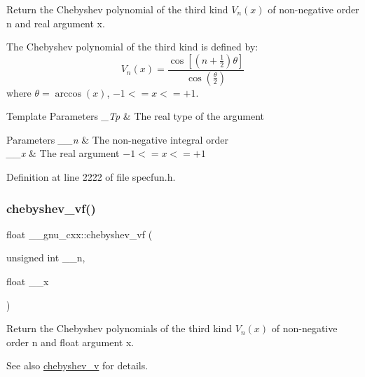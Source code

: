Return the Chebyshev polynomial of the third kind $ V_n(x) $ of non-\/negative order {\ttfamily n} and real argument {\ttfamily x}.

The Chebyshev polynomial of the third kind is defined by\+: \[ V_n(x) = \frac{\cos \left[ \left(n+\frac{1}{2}\right)\theta \right]} {\cos \left(\frac{\theta}{2}\right)} \] where $ \theta = \arccos(x) $, $ -1 <= x <= +1 $.


\begin{DoxyTemplParams}{Template Parameters}
{\em \+\_\+\+Tp} & The real type of the argument \\
\hline
\end{DoxyTemplParams}

\begin{DoxyParams}{Parameters}
{\em \+\_\+\+\_\+n} & The non-\/negative integral order \\
\hline
{\em \+\_\+\+\_\+x} & The real argument $ -1 <= x <= +1 $ \\
\hline
\end{DoxyParams}


Definition at line 2222 of file specfun.\+h.

\mbox{\label{group__mathsf__gnu_gaa9635a0da4bdeaa8060ae5cf03c3a12d}} 
\subsubsection{\texorpdfstring{chebyshev\+\_\+vf()}{chebyshev\_vf()}}
{\footnotesize\ttfamily float \+\_\+\+\_\+gnu\+\_\+cxx\+::chebyshev\+\_\+vf (\begin{DoxyParamCaption}\item[{unsigned int}]{\+\_\+\+\_\+n,  }\item[{float}]{\+\_\+\+\_\+x }\end{DoxyParamCaption})\hspace{0.3cm}{\ttfamily [inline]}}

Return the Chebyshev polynomials of the third kind $ V_n(x) $ of non-\/negative order {\ttfamily n} and {\ttfamily float} argument {\ttfamily x}.

\begin{DoxySeeAlso}{See also}
\hyperlink{group__mathsf__gnu_ga32b7decd0002f542d2c9187c5f0846c6}{chebyshev\+\_\+v} for details. 
\end{DoxySeeAlso}



